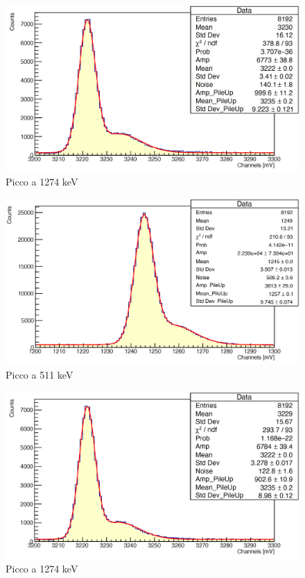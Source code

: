 \documentclass[a4paper,10pt]{article}
\begin{document}
\begin{figure}[H]
    \centering
    \includegraphics[scale=0.45]{appendice/spettri/NaCu2_22}
    \caption{Picco a 1274 keV}
\end{figure}
\begin{figure}[H]
    \centering
    \includegraphics[scale=0.45]{appendice/spettri/NaCu1_33}
    \caption{Picco a 511 keV}
\end{figure}
\begin{figure}[H]
    \centering
    \includegraphics[scale=0.45]{appendice/spettri/NaCu2_33}
    \caption{Picco a 1274 keV}
\end{figure}
\end{document}
